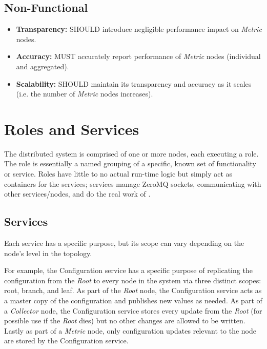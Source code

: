\subsection{Non-Functional}

\begin{itemize}

\item \textbf{Transparency:} \dcamp SHOULD introduce negligible performance impact on \textit{Metric} nodes.
\item \textbf{Accuracy:} \dcamp MUST accurately report performance of \textit{Metric} nodes (individual and aggregated).
\item \textbf{Scalability:} \dcamp SHOULD maintain its transparency and accuracy as it scales (i.e. the number of
      \textit{Metric} nodes increases).

\end{itemize}

\section{\dcamp Roles and Services}
\label{roles_and_services}

The \dcamp distributed system is comprised of one or more nodes, each executing a role. The role is essentially a named
grouping of a specific, known set of functionality or service. Roles have little to no actual run-time logic but simply
act as containers for the services; services manage ZeroMQ sockets, communicating with other services/nodes, and do the
real work of \dcampns.

\subsection{Services}

Each \dcamp service has a specific purpose, but its scope can vary depending on the node's level in the \dcamp topology.

For example, the Configuration service has a specific purpose of replicating the \dcamp configuration from the
\textit{Root} to every node in the system via three distinct scopes: root, branch, and leaf. As part of the
\textit{Root} node, the Configuration service acts as a master copy of the configuration and publishes new values as
needed. As part of a \textit{Collector} node, the Configuration service stores every update from the \textit{Root} (for
possible use if the \textit{Root} dies) but no other changes are allowed to be written. Lastly as part of a
\textit{Metric} node, only configuration updates relevant to the node are stored by the Configuration service.

